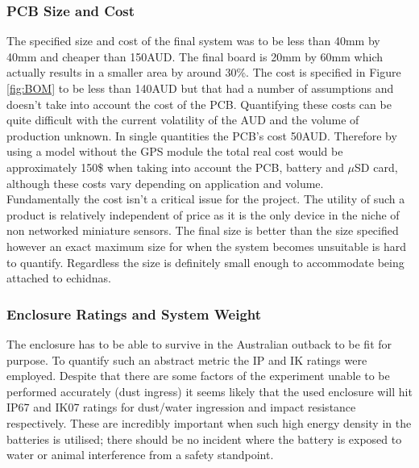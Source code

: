 \documentclass[12pt,openany,a4paper]{book}
\begin{document}
	\subsubsection{PCB Size and Cost}
	The specified size and cost of the final system was to be less than 40mm by 40mm and cheaper than 150AUD. The final board is 20mm by 60mm which actually results in a smaller area by around 30\%. The cost is specified in Figure \ref{fig:BOM} to be less than 140AUD but that had a number of assumptions and doesn't take into account the cost of the PCB. Quantifying these costs can be quite difficult with the current volatility of the AUD and the volume of production unknown. In single quantities the PCB's cost 50AUD. Therefore by using a model without the GPS module the total real cost would be approximately 150\$ when taking into account the PCB, battery and $\mu$SD card, although these costs vary depending on application and volume. \\
	
	Fundamentally the cost isn't a critical issue for the project. The utility of such a product is relatively independent of price as it is the only device in the niche of non networked miniature sensors. The final size is better than the size specified however an exact maximum size for when the system becomes unsuitable is hard to quantify. Regardless the size is definitely small enough to accommodate being attached to echidnas. \\
	
	\subsubsection{Enclosure Ratings and System Weight}
	The enclosure has to be able to survive in the Australian outback to be fit for purpose. To quantify such an abstract metric the IP and IK ratings were employed. Despite that there are some factors of the experiment unable to be performed accurately (dust ingress) it seems likely that the used enclosure will hit IP67 and IK07 ratings for dust/water ingression and impact resistance respectively. These are incredibly important when such high energy density in the batteries is utilised; there should be no incident where the battery is exposed to water or animal interference from a safety standpoint. \\
	
\end{document}
